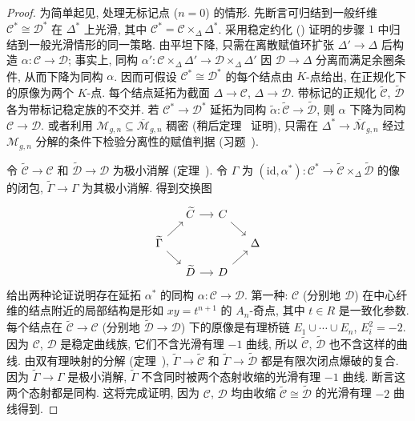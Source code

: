 \begin{proof}
为简单起见, 处理无标记点 ($n=0$) 的情形. 先断言可归结到一般纤维 $\mathcal C^*\cong\mathcal D^*$ 在 $\Delta^*$ 上光滑, 其中 $\mathcal C^*=\mathcal C\times_\Delta\Delta^*$. 采用稳定约化 () 证明的步骤 $1$ 中归结到一般光滑情形的同一策略. 由平坦下降, 只需在离散赋值环扩张 $\Delta'\to\Delta$ 后构造 $\alpha:\mathcal C\to\mathcal D$; 事实上, 同构 $\alpha':\mathcal C\times_\Delta\Delta'\to\mathcal D\times_\Delta\Delta'$ 因 $\mathcal D\to\Delta$ 分离而满足余圈条件, 从而下降为同构 $\alpha$. 因而可假设 $\mathcal C^*\cong\mathcal D^*$ 的每个结点由 $K$-点给出, 在正规化下的原像为两个 $K$-点. 每个结点延拓为截面 $\Delta\to\mathcal C$, $\Delta\to\mathcal D$. 带标记的正规化 $\widetilde{\mathcal C}$, $\widetilde{\mathcal D}$ 各为带标记稳定族的不交并. 若 $\mathcal C^*\to\mathcal D^*$ 延拓为同构 $\widetilde\alpha:\widetilde{\mathcal C}\to\widetilde{\mathcal D}$, 则 $\alpha$ 下降为同构 $\mathcal C\to\mathcal D$. 或者利用 $\mathcal M_{g,\allowbreak n}\subseteq\overline{\mathcal M}_{g,\allowbreak n}$ 稠密 (稍后定理~ 证明), 只需在 $\Delta^*\to\overline{\mathcal M}_{g,\allowbreak n}$ 经过 $\mathcal M_{g,\allowbreak n}$ 分解的条件下检验分离性的赋值判据 (习题~).

令 $\widetilde{\mathcal C}\to\mathcal C$ 和 $\widetilde{\mathcal D}\to\mathcal D$ 为极小消解 (定理~). 令 $\Gamma$ 为 $(\mathrm{id},\allowbreak \alpha^*):\mathcal C^*\to\widetilde{\mathcal C}\times_\Delta\widetilde{\mathcal D}$ 的像的闭包, $\widetilde\Gamma\to\Gamma$ 为其极小消解. 得到交换图
\begin{equation}\label{src:6.5.21}
\begin{tikzcd}[column sep=small,row sep=small]
&\widetilde{\mathcal C}\arrow[r]&\mathcal C\arrow[dr]&\\
\widetilde\Gamma\arrow[ur]\arrow[dr]&&&\Delta\\
&\widetilde{\mathcal D}\arrow[r]&\mathcal D\arrow[ur]&
\end{tikzcd}
\end{equation}
给出两种论证说明存在延拓 $\alpha^*$ 的同构 $\alpha:\mathcal C\to\mathcal D$. 第一种: $\mathcal C$ (分别地 $\mathcal D$) 在中心纤维的结点附近的局部结构是形如 $xy=t^{n+1}$ 的 $A_n$-奇点, 其中 $t\in R$ 是一致化参数. 每个结点在 $\widetilde{\mathcal C}\to\mathcal C$ (分别地 $\widetilde{\mathcal D}\to\mathcal D$) 下的原像是有理桥链 $E_1\cup\cdots\cup E_n$, $E_i^2=-2$. 因为 $\mathcal C$, $\mathcal D$ 是稳定曲线族, 它们不含光滑有理 $-1$ 曲线, 所以 $\widetilde{\mathcal C}$, $\widetilde{\mathcal D}$ 也不含这样的曲线. 由双有理映射的分解 (定理~), $\widetilde\Gamma\to\widetilde{\mathcal C}$ 和 $\widetilde\Gamma\to\widetilde{\mathcal D}$ 都是有限次闭点爆破的复合. 因为 $\widetilde\Gamma\to\Gamma$ 是极小消解, $\widetilde\Gamma$ 不含同时被两个态射收缩的光滑有理 $-1$ 曲线. 断言这两个态射都是同构. 这将完成证明, 因为 $\mathcal C$, $\mathcal D$ 均由收缩 $\widetilde{\mathcal C}\cong\widetilde{\mathcal D}$ 的光滑有理 $-2$ 曲线得到.


\end{proof}
